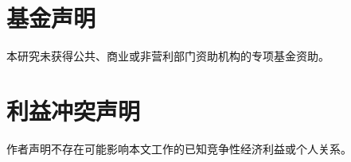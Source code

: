 \documentclass[UTF8,11pt]{ctexart}
\begin{document}
\section*{基金声明}

本研究未获得公共、商业或非营利部门资助机构的专项基金资助。

\section*{利益冲突声明}

作者声明不存在可能影响本文工作的已知竞争性经济利益或个人关系。


\begingroup
{}

\endgroup
\end{document}
